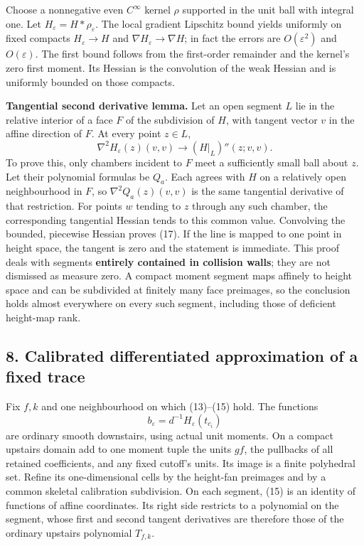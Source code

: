 \documentclass[11pt]{article}
\begin{document}
Choose a nonnegative even \(C^\infty\) kernel \(\rho\) supported in the
unit ball with integral one. Let \(H_\varepsilon=H*\rho_\varepsilon\).
The local gradient Lipschitz bound yields uniformly on fixed compacts
\(H_\varepsilon\to H\) and \(\nabla H_\varepsilon\to\nabla H\); in fact
the errors are \(O(\varepsilon^2)\) and \(O(\varepsilon)\). The first
bound follows from the first-order remainder and the kernel's zero first
moment. Its Hessian is the convolution of the weak Hessian and is
uniformly bounded on those compacts.

\textbf{Tangential second derivative lemma.} Let an open segment \(L\)
lie in the relative interior of a face \(F\) of the subdivision of
\(H\), with tangent vector \(v\) in the affine direction of \(F\). At
every point \(z\in L\), \[
        \nabla^2H_\varepsilon(z)(v,v)
                  \longrightarrow (H|_L)''(z;v,v).       \tag{17}
\] To prove this, only chambers incident to \(F\) meet a sufficiently
small ball about \(z\). Let their polynomial formulas be \(Q_a\). Each
agrees with \(H\) on a relatively open neighbourhood in \(F\), so
\(\nabla^2Q_a(z)(v,v)\) is the same tangential derivative of that
restriction. For points \(w\) tending to \(z\) through any such chamber,
the corresponding tangential Hessian tends to this common value.
Convolving the bounded, piecewise Hessian proves (17). If the line is
mapped to one point in height space, the tangent is zero and the
statement is immediate. This proof deals with segments \textbf{entirely
contained in collision walls}; they are not dismissed as measure zero. A
compact moment segment maps affinely to height space and can be
subdivided at finitely many face preimages, so the conclusion holds
almost everywhere on every such segment, including those of deficient
height-map rank.

\subsection{8. Calibrated differentiated approximation of a fixed
trace}\label{calibrated-differentiated-approximation-of-a-fixed-trace}

Fix \(f,k\) and one neighbourhood on which (13)--(15) hold. The
functions \[
                b_\varepsilon=d^{-1}H_\varepsilon(t_{c_i})
                                                               \tag{18}
\] are ordinary smooth downstairs, using actual unit moments. On a
compact upstairs domain add to one moment tuple the units \(gf\), the
pullbacks of all retained coefficients, and any fixed cutoff's units.
Its image is a finite polyhedral set. Refine its one-dimensional cells
by the height-fan preimages and by a common skeletal calibration
subdivision. On each segment, (15) is an identity of functions of affine
coordinates. Its right side restricts to a polynomial on the segment,
whose first and second tangent derivatives are therefore those of the
ordinary upstairs polynomial \(T_{f,k}\).
\end{document}
